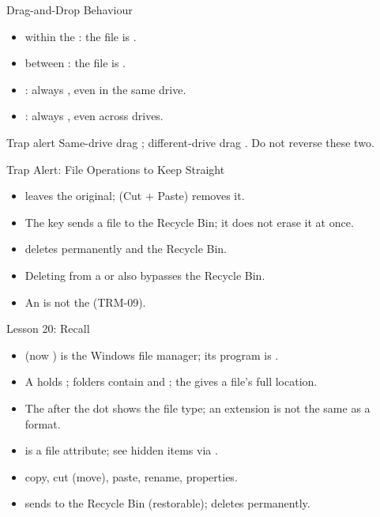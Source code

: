 \documentclass[aspectratio=169]{beamer}
\begin{document}
\begin{frame}{Drag-and-Drop Behaviour}
  \begin{itemize}
    \item {} within the : the file is .
    \item {} between : the file is .
    \item {}: always , even in
      the same drive.
    \item {}: always , even
      across drives.
  \end{itemize}
  \begin{alertblock}{Trap alert}
    Same-drive drag ; different-drive drag . Do not
    reverse these two.
  \end{alertblock}
\end{frame}

\begin{frame}{Trap Alert: File Operations to Keep Straight}
  \begin{itemize}
    \item {} leaves the original;  (Cut + Paste) removes it.
    \item The  key sends a file to the Recycle Bin; it does not
      erase it at once.
    \item {} deletes permanently and
       the Recycle Bin.
    \item Deleting from a  or  also bypasses
      the Recycle Bin.
    \item An  is not the  (TRM-09).
  \end{itemize}
\end{frame}

\begin{frame}{Lesson 20: Recall}
  \begin{itemize}
    \item {} (now ) is the Windows
      file manager; its program is .
    \item A  holds ; folders contain 
      and ; the  gives a file's full location.
    \item The  after the dot shows the file type; an extension
      is not the same as a format.
    \item {} is a file attribute; see hidden items via .
    \item {} copy,  cut (move),  paste,
       rename,  properties.
    \item {} sends to the Recycle Bin (restorable);
       deletes permanently.
  \end{itemize}
\end{frame}
\end{document}

